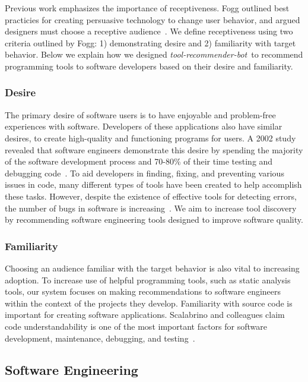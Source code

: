\documentclass[sigconf,review,anonymous]{acmart}
\newcommand{\tool}{\textsl{tool-recommender-bot}}
\begin{document}
Previous work emphasizes the importance of receptiveness. Fogg outlined best practicies for creating persuasive technology to change user behavior, and argued designers must choose a receptive audience~\cite{FoggPersuasive}. We define receptiveness using two criteria outlined by Fogg: 1) demonstrating desire and 2) familiarity with target behavior. Below we explain how we designed \tool~to recommend programming tools to software developers based on their desire and familiarity.

\subsubsection{Desire}

The primary desire of software users is to have enjoyable and problem-free experiences with software. Developers of these applications also have similar desires, to create high-quality and functioning programs for users. A 2002 study revealed that software engineers demonstrate this desire by spending the majority of the software development process and 70-80\% of their time testing and debugging code~\cite{NIST}. To aid developers in finding, fixing, and preventing various issues in code, many different types of tools have been created to help accomplish these tasks. However, despite the existence of effective tools for detecting errors, the number of bugs in software is increasing~\cite{HaveThingsChanged}. We aim to increase tool discovery by recommending software engineering tools designed to improve software quality.

\subsubsection{Familiarity}

Choosing an audience familiar with the target behavior is also vital to increasing adoption. To increase use of helpful programming tools, such as static analysis tools, our system focuses on making recommendations to software engineers within the context of the projects they develop. Familiarity with source code is important for creating software applications. Scalabrino and colleagues claim code understandability is one of the most important factors for software development, maintenance, debugging, and testing~\cite{Scalabrino2017Understandability}.

\subsection{Software Engineering}
\end{document}
